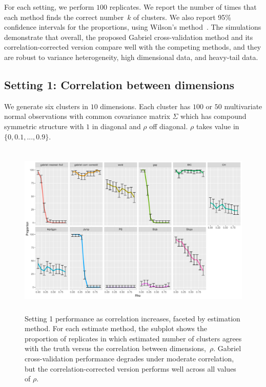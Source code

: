 \documentclass[12pt]{article}
\begin{document}
For each setting, we perform $100$ replicates. We report the number of times
that each method finds the correct number~$k$ of clusters. We also report 95\%
confidence intervals for the proportions, using Wilson's
method~\citep{wilson1927probable}.  The simulations demonstrate that overall,
the proposed Gabriel cross-validation method and its correlation-corrected
version compare well with the competing methods, and they are robust to
variance heterogeneity, high dimensional data, and heavy-tail data.


\subsection{Setting 1: Correlation between dimensions}

We generate six clusters in $10$ dimensions.  Each cluster has $100$ or $50$
multivariate normal observations with common covariance matrix $\Sigma$ which
has compound symmetric structure with $1$ in diagonal and $\rho$ off diagonal.
$\rho$ takes value in $\{0,0.1,...,0.9\}$.
	
\begin{figure}[H]
\centering
\includegraphics[width=5.5in, height=3.3in]{main_code/demo/bench/setting1/Facet.pdf}
\caption{Setting 1 performance as correlation increases, faceted by estimation
    method. For each estimate method, the subplot shows the proportion of
    replicates in which estimated number of clusters agrees with the truth
    versus the correlation between dimensions,~$\rho$. Gabriel
    cross-validation performance degrades under moderate correlation, but
    the correlation-corrected version performs well across all values of
    $\rho$.}
\label{fig:setting1}
\end{figure}
	
\end{document}
